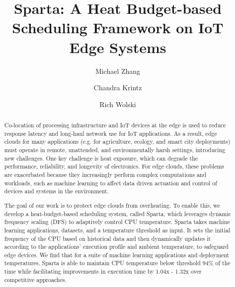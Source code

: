 \documentclass[runningheads]{llncs}
\begin{document}
%

\title{Sparta: A Heat Budget-based Scheduling Framework on IoT Edge Systems}

%
%


\author{Michael Zhang \and
Chandra Krintz \and
Rich Wolski}


%
\maketitle              %
%


\begin{abstract}
Co-location of processing infrastructure and IoT devices at the edge
is used to reduce response latency and long-haul network use for IoT applications.
As a result, edge clouds for many applications (e.g. for agriculture, 
ecology, and smart city deployments) must operate in remote, 
unattended, and environmentally harsh settings, introducing new challenges.
One key challenge is heat exposure, which can degrade the performance, 
reliability, and longevity of electronics. For edge clouds, these problems 
are exacerbated because they increasingly perform
complex computations and workloads, such as machine learning to affect
data driven actuation and control of devices and systems in the environment.

\vspace{0.08in}
The goal of our work is to protect edge clouds from overheating.
To enable this, we develop a heat-budget-based scheduling system, called Sparta, 
which leverages dynamic frequency scaling (DFS) to adaptively control CPU temperature. 
Sparta takes machine learning applications, datasets, and a temperature 
threshold as input. It sets the initial frequency of the CPU based on historical data 
and then dynamically updates it according to the applications' execution  profile
and ambient temperature, to safeguard edge devices.
We find that for a suite of machine learning applications and deployment
temperatures, Sparta is able to maintain CPU temperature below threshold
94\% of the time while facilitating improvements in execution time by 1.04x - 1.32x
over competitive approaches.


\end{abstract}
%
%
%
\end{document}
